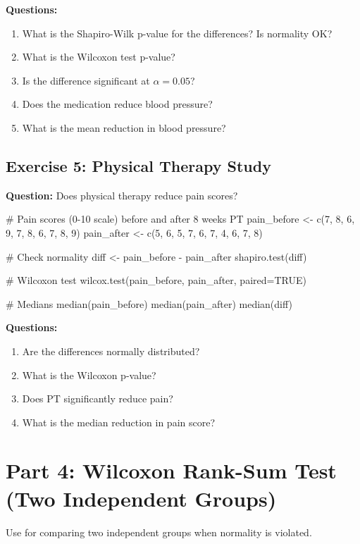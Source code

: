 \documentclass[11pt]{article}
\begin{document}
\textbf{Questions:}
\begin{enumerate}
\item What is the Shapiro-Wilk p-value for the differences? Is normality OK?
\item What is the Wilcoxon test p-value?
\item Is the difference significant at $\alpha = 0.05$?
\item Does the medication reduce blood pressure?
\item What is the mean reduction in blood pressure?
\end{enumerate}

\vspace{1cm}

\subsection{Exercise 5: Physical Therapy Study}

\textbf{Question:} Does physical therapy reduce pain scores?

\begin{rcode}
# Pain scores (0-10 scale) before and after 8 weeks PT
pain_before <- c(7, 8, 6, 9, 7, 8, 6, 7, 8, 9)
pain_after <- c(5, 6, 5, 7, 6, 7, 4, 6, 7, 8)

# Check normality
diff <- pain_before - pain_after
shapiro.test(diff)

# Wilcoxon test
wilcox.test(pain_before, pain_after, paired=TRUE)

# Medians
median(pain_before)
median(pain_after)
median(diff)
\end{rcode}

\textbf{Questions:}
\begin{enumerate}
\item Are the differences normally distributed?
\item What is the Wilcoxon p-value?
\item Does PT significantly reduce pain?
\item What is the median reduction in pain score?
\end{enumerate}

\vspace{1cm}

\section{Part 4: Wilcoxon Rank-Sum Test (Two Independent Groups)}

Use for comparing two independent groups when normality is violated.
\end{document}
